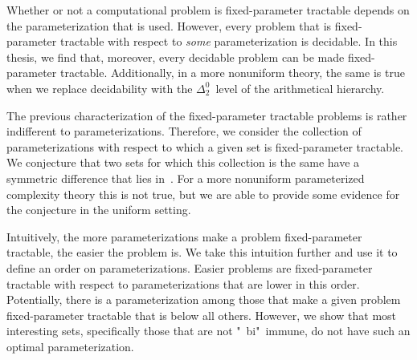 Whether or not a computational problem is fixed-parameter tractable depends on the parameterization that is used.
However, every problem that is fixed-parameter tractable with respect to \emph{some} parameterization is decidable.
In this thesis, we find that, moreover, every decidable problem can be made fixed-parameter tractable.
Additionally, in a more nonuniform theory, the same is true when we replace decidability with the $\Delta^0_2$~level of the arithmetical hierarchy.

The previous characterization of the fixed-parameter tractable problems is rather indifferent to parameterizations.
Therefore, we consider the collection of parameterizations with respect to which a given set is fixed-parameter tractable.
We conjecture that two sets for which this collection is the same have a symmetric difference that lies in~.
For a more nonuniform parameterized complexity theory this is not true, but we are able to provide some evidence for the conjecture in the uniform setting.

Intuitively, the more parameterizations make a problem fixed-parameter tractable, the easier the problem is.
We take this intuition further and use it to define an order on parameterizations.
Easier problems are fixed-parameter tractable with respect to parameterizations that are lower in this order.
Potentially, there is a parameterization among those that make a given problem fixed-parameter tractable that is below all others.
However, we show that most interesting sets, specifically those that are not "~bi"~immune, do not have such an optimal parameterization.

